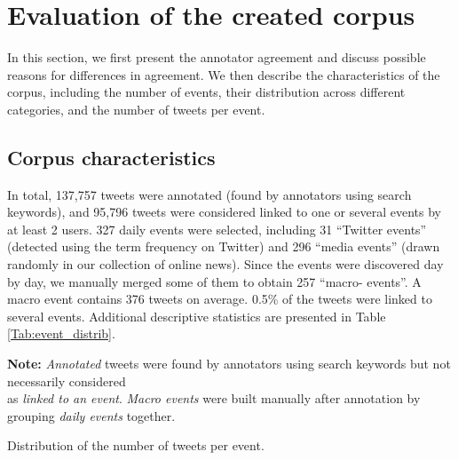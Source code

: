 \section{Evaluation of the created corpus}
\label{Evaluation of the created corpus}

In this section, we first present the annotator agreement and discuss possible reasons for differences in agreement. We then describe  the characteristics of the corpus, including the number of events, their distribution across different categories, and the number of tweets per event. 


	\subsection{Corpus characteristics}
In total, 137,757 tweets were annotated (found by
annotators using search keywords), and 95,796 tweets
were considered linked to one or several events by at least 2 users. 327
daily events were selected, including 31 “Twitter events”
(detected using the term frequency on Twitter) and 296
“media events” (drawn randomly in our collection of
online news). Since the events were discovered day by day, we
manually merged some of them to obtain 257 “macro-
events”. A macro event contains 376 tweets on average. 0.5\%
of the tweets were linked to several events. Additional
descriptive statistics are presented in Table \ref{Tab:event_distrib}.

\begin{table}
\begin{center}
\makebox[\textwidth][c]{}
{\scriptsize \textbf{Note:} \textit{Annotated} tweets were found by annotators using search
keywords but not necessarily considered \\as \textit{linked to an event}. \textit{Macro events} were built manually after annotation by grouping \textit{daily events} together.}
\end{center}
\caption{Distribution of the number of tweets per event. \label{Tab:event_distrib}}
\end{table}



%
%

